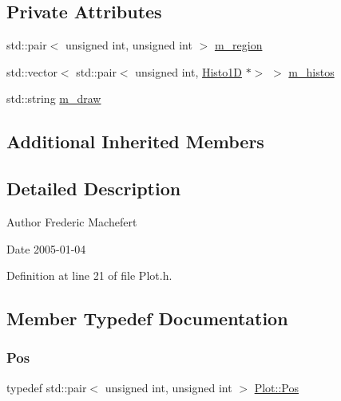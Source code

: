 \subsection*{Private Attributes}
\begin{DoxyCompactItemize}
\item 
std\+::pair$<$ unsigned int, unsigned int $>$ \hyperlink{classPlot_aabcbba1cfc66babcbcd647fdf90cdbf1}{m\+\_\+region}
\item 
std\+::vector$<$ std\+::pair$<$ unsigned int, \hyperlink{classHisto1D}{Histo1D} $\ast$$>$ $>$ \hyperlink{classPlot_a7edebf2b275223b8ce55f6ef3b2da0cc}{m\+\_\+histos}
\item 
std\+::string \hyperlink{classPlot_a83ffbf3effe6a2f8befa6375882f3994}{m\+\_\+draw}
\end{DoxyCompactItemize}
\subsection*{Additional Inherited Members}


\subsection{Detailed Description}
\begin{DoxyAuthor}{Author}
Frederic Machefert 
\end{DoxyAuthor}
\begin{DoxyDate}{Date}
2005-\/01-\/04 
\end{DoxyDate}


Definition at line 21 of file Plot.\+h.



\subsection{Member Typedef Documentation}
\mbox{\label{classPlot_a07543869c4a57b91ea0ec9835cb165ca}} 
\subsubsection{\texorpdfstring{Pos}{Pos}}
{\footnotesize\ttfamily typedef std\+::pair$<$ unsigned int, unsigned int $>$ \hyperlink{classPlot_a07543869c4a57b91ea0ec9835cb165ca}{Plot\+::\+Pos}\hspace{0.3cm}{\ttfamily [private]}}



